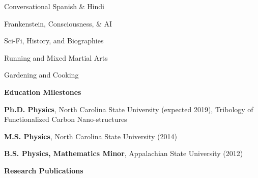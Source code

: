 \documentclass[letterpaper,final]{memoir}
\newcommand{\LargeSep}{\vspace{1.3em}}
\newcommand{\Sep}{\vspace{1.0em}}
\newcommand{\SmallSep}{\vspace{0.4em}}
\newcommand{\CVSection}[1]
	{\LARGE\textbf{#1}\par
	\SmallSep\normalsize}
\begin{document}
\begin{multicols}{2}

    \begin{compactitem}[\color{Blue}$\circ$] 
        
        \item Conversational Spanish \& Hindi
        \item Frankenstein, Consciousness, \& AI
        \SmallSep

        \item Sci-Fi, History, and Biographies
		\item Running and Mixed Martial Arts
        \SmallSep
        
        \item Gardening and Cooking
        

	\end{compactitem}
\end{multicols}
\LargeSep


\newpage

\notoserif \CVSection{Education Milestones}
\normalfont
\Sep
\begin{compactitem}[\color{Blue}$\circ$]

\item \textbf{Ph.D. Physics}, North Carolina State University (expected 2019), Tribology of Functionalized Carbon Nano-structures
\SmallSep

\item \textbf{M.S. Physics}, North Carolina State University (2014)
\SmallSep

\item \textbf{B.S. Physics, Mathematics Minor}, Appalachian State University (2012)

\end{compactitem}
\Sep



\notoserif \CVSection{Research Publications}
\normalfont

\SmallSep
\end{document}
